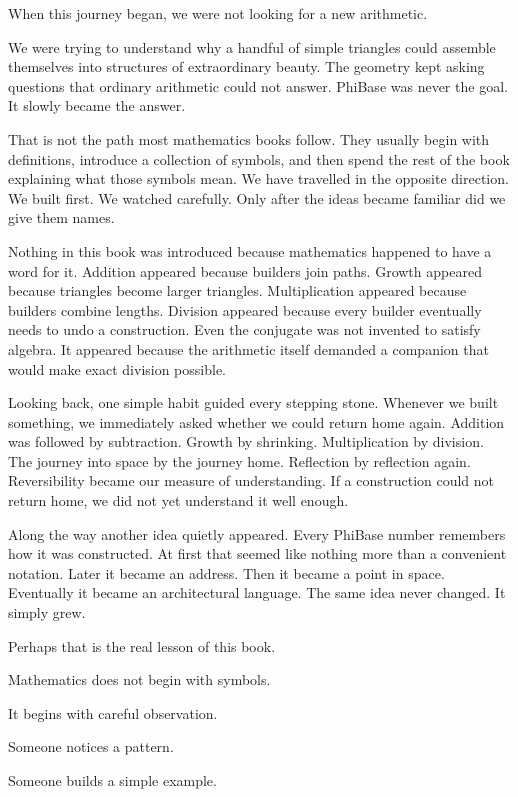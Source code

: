 \label{stone:builder}

When this journey began, we were not looking for a new arithmetic.

We were trying to understand why a handful of simple triangles could assemble themselves into structures of extraordinary beauty. The geometry kept asking questions that ordinary arithmetic could not answer. PhiBase was never the goal. It slowly became the answer.

That is not the path most mathematics books follow. They usually begin with definitions, introduce a collection of symbols, and then spend the rest of the book explaining what those symbols mean. We have travelled in the opposite direction. We built first. We watched carefully. Only after the ideas became familiar did we give them names.

Nothing in this book was introduced because mathematics happened to have a word for it. Addition appeared because builders join paths. Growth appeared because triangles become larger triangles. Multiplication appeared because builders combine lengths. Division appeared because every builder eventually needs to undo a construction. Even the conjugate was not invented to satisfy algebra. It appeared because the arithmetic itself demanded a companion that would make exact division possible.

Looking back, one simple habit guided every stepping stone. Whenever we built something, we immediately asked whether we could return home again. Addition was followed by subtraction. Growth by shrinking. Multiplication by division. The journey into space by the journey home. Reflection by reflection again. Reversibility became our measure of understanding. If a construction could not return home, we did not yet understand it well enough.

Along the way another idea quietly appeared. Every PhiBase number remembers how it was constructed. At first that seemed like nothing more than a convenient notation. Later it became an address. Then it became a point in space. Eventually it became an architectural language. The same idea never changed. It simply grew.

Perhaps that is the real lesson of this book.

Mathematics does not begin with symbols.

It begins with careful observation.

Someone notices a pattern.

Someone builds a simple example.

